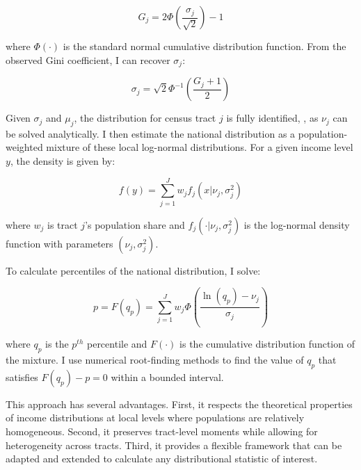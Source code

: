 \begin{equation}
G_j = 2\Phi\left(\frac{\sigma_j}{\sqrt{2}}\right) - 1
\end{equation}

where $\Phi(\cdot)$ is the standard normal cumulative distribution function. From the observed Gini coefficient, I can recover $\sigma_j$:

\begin{equation}
\sigma_j = \sqrt{2}\Phi^{-1}\left(\frac{G_j + 1}{2}\right)
\end{equation}

Given $\sigma_j$ and $\mu_j$, the distribution for census tract $j$ is fully identified, , as $\nu_j$ can be solved analytically. I then estimate the national distribution as a population-weighted mixture of these local log-normal distributions. For a given income level $y$, the density is given by:

\begin{equation}
f(y) = \sum_{j=1}^{J} w_j f_j(x|\nu_j,\sigma_j^2)
\end{equation}

where $w_j$ is tract $j$'s population share and $f_j(\cdot|\nu_j,\sigma_j^2)$ is the log-normal density function with parameters $(\nu_j,\sigma_j^2)$.

To calculate percentiles of the national distribution, I solve:

\begin{equation}
p = F(q_p) = \sum_{j=1}^{J} w_j \Phi\left(\frac{\ln(q_p) - \nu_j}{\sigma_j}\right)
\end{equation}

where $q_p$ is the $p^{th}$ percentile and $F(\cdot)$ is the cumulative distribution function of the mixture. I use numerical root-finding methods to find the value of $q_p$ that satisfies $F(q_p) - p = 0$ within a bounded interval.

This approach has several advantages. First, it respects the theoretical properties of income distributions at local levels where populations are relatively homogeneous. Second, it preserves tract-level moments while allowing for heterogeneity across tracts. Third, it provides a flexible framework that can be adapted and extended to calculate any distributional statistic of interest.

